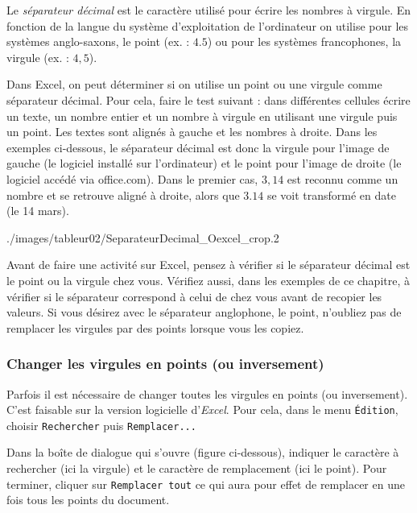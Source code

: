 Le \emph{séparateur décimal} est le caractère utilisé pour écrire les nombres à virgule. En fonction de la langue du système d'exploitation de l'ordinateur on utilise pour les systèmes anglo-saxons, le point (ex. : $4.5$) ou pour les systèmes francophones, la virgule (ex. : $4,5$).

\vspace{6pt}

Dans Excel, on peut déterminer si on utilise un point ou une virgule comme séparateur décimal. Pour cela, faire le test suivant : dans différentes cellules écrire un texte, un nombre entier et un nombre à virgule en utilisant une virgule puis un point. Les textes sont alignés à gauche et les nombres à droite. Dans les exemples ci-dessous, le séparateur décimal est donc la virgule pour l'image de gauche (le logiciel installé sur l'ordinateur) et le point pour l'image de droite (le logiciel accédé via office.com). Dans le premier cas, $3,14$ est reconnu comme un nombre et se retrouve aligné à droite, alors que $3.14$ se voit transformé en date (le 14 mars).

%  
{./images/tableur02/SeparateurDecimal_Oexcel_crop}{.2\textwidth}

Avant de faire une activité sur Excel, pensez à vérifier si le séparateur décimal est le point ou la virgule chez vous. Vérifiez aussi, dans les exemples de ce chapitre, à vérifier si le séparateur correspond à celui de chez vous avant de recopier les valeurs. Si vous désirez avec le séparateur anglophone, le point, n'oubliez pas de remplacer les virgules par des points lorsque vous les copiez.

\subsubsection{Changer les virgules en points (ou inversement)}

Parfois il est nécessaire de changer toutes les virgules en points (ou inversement). C'est faisable sur la version logicielle d'\emph{Excel}. Pour cela, dans le menu \texttt{Édition}, choisir \texttt{Rechercher} puis \texttt{Remplacer...}


Dans la boîte de dialogue qui s'ouvre (figure ci-dessous), indiquer le caractère à rechercher  (ici la virgule) et le caractère de remplacement  (ici le point). Pour terminer, cliquer sur \texttt{Remplacer tout}  ce qui aura pour effet de remplacer en une fois tous les points du document.

